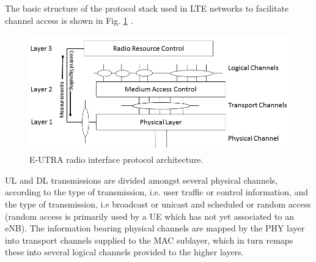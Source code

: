 The basic structure of the protocol stack used in LTE networks to facilitate channel access is shown in Fig. \ref{figs:stack} \cite{tr36201}.
\begin{figure}[!ht]	
	\includegraphics[width=\textwidth]{figures3/LTEradio-interface}
	\caption{E-UTRA radio interface protocol architecture.}
	\label{figs:stack}
\end{figure}
UL and DL transmissions are divided amongst several physical channels, according to the type of transmission, i.e. user traffic or control information, and the type of transmission, i.e broadcast or unicast and scheduled or random access (random access is primarily used by a UE which has not yet associated to an eNB). The information bearing physical channels are mapped by the PHY layer into transport channels supplied to the MAC sublayer, which in turn remaps these into several logical channels provided to the higher layers. 

